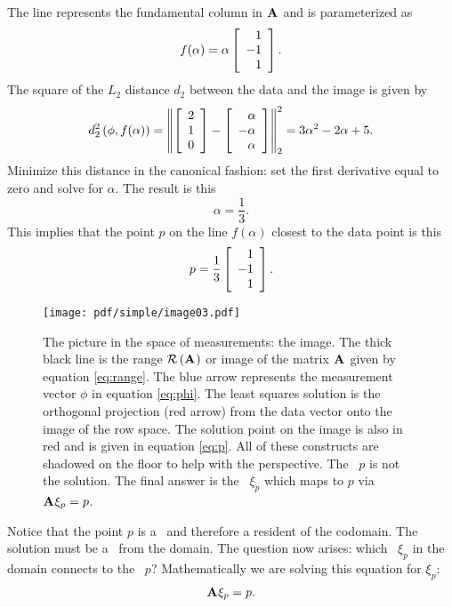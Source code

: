 The line represents the fundamental column in $\A{}$ and is parameterized as
\begin{equation}
  \begin{split}
    f(\alpha)=\alpha\mat{r}{1\\-1\\1}.
    \label{eq:range}
  \end{split}
\end{equation}
The square of the $L_{2}$ distance $d_{2}$ between the data and the image is given by
\begin{equation}
  d_{2}^{2}\paren{\phi,f(\alpha)} = \normt{\phivector-\mat{r}{\alpha\\-\alpha\\ \alpha}}^{2} = 3\alpha^{2}-2\alpha+5.
\end{equation}
Minimize this distance in the canonical fashion: set the first derivative equal to zero and solve for $\alpha$. The result is this
\begin{equation}
  \alpha = \frac{1}{3}.
\end{equation}
This implies that the point $p$ on the line $f(\alpha)$ closest to the data point is this
\begin{equation}
  p=\frac{1}{3}\mat{r}{1\\-1\\1}.
  \label{eq:p}
\end{equation}
\begin{figure}[h]
   \centering
   \texttt{[image: pdf/simple/image03.pdf]} 
   \caption{The picture in the space of measurements: the image. The thick black line is the range $\rng{\A{}}$ or image of the matrix $\A{}$ given by equation \eqref{eq:range}. The blue arrow represents the measurement vector $\phi$ in equation \eqref{eq:phi}. The least squares solution is the orthogonal projection (red arrow) from the data vector onto the image of the row space. The solution point on the image is also in red and is given in equation \eqref{eq:p}. All of these constructs are shadowed on the floor to help with the perspective. The \vvv \ $p$ is not the solution. The final answer is the \vv \ $\xi_{p}$ which maps to $p$ via $\A{}\xi_{p}=p$. }
   \label{fig:image}
\end{figure}

Notice that the point $p$ is a \vvv \ and therefore a resident of the codomain. The solution must be a \vv \ from the domain. The question now arises: which \vv \ $\xi_{p}$ in the domain connects to the \vvv \ $p$? Mathematically we are solving this equation for $\xi_{p}$:
\begin{equation}
  \A{}\xi_{p}=p.
\end{equation}

